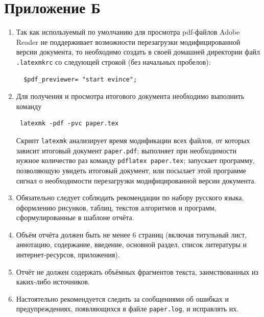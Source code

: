 \section{Приложение Б}

\begin{enumerate}

\item
Так как используемый по умолчанию для просмотра pdf-файлов Adobe Reader не 
поддерживает возможности перезагрузки модифицированной версии документа, то
необходимо создать в своей домашней директории файл \verb|.latexmkrc|
со следующей строкой (без начальных пробелов):

\begin{verbatim}
  $pdf_previewer= "start evince";
\end{verbatim} 

\item
Для получения и просмотра итогового документа необходимо выполнить команду

\begin{verbatim}
 latexmk -pdf -pvc paper.tex
\end{verbatim} 

\noindent
Скрипт \verb|latexmk| анализирует время модификации всех файлов, от которых
зависит итоговый документ \verb|paper.pdf|; выполняет при необходимости
нужное количество раз команду \verb|pdflatex paper.tex|; запускает программу,
позволяющую увидеть итоговый документ, или посылает этой программе
сигнал о необходимости перезагрузки модифицированной версии документа. 

\item
Обязательно следует соблюдать рекомендации по набору русского языка, 
оформлению рисунков, таблиц, текстов алгоритмов и программ, сформулированные
в шаблоне отчёта.

\item
Объём отчёта должен быть не менее
6 страниц (включая титульный лист, аннотацию, содержание, введение,
основной раздел, список литературы и интернет-ресурсов, приложения).

\item
Отчёт не должен содержать объёмных фрагментов текста, заимствованных из
каких-либо источников. 

\item
Настоятельно рекомендуется следить за сообщениями об ошибках и 
предупреждениях, появляющихся в файле \verb|paper.log|, и исправлять их.

\end{enumerate}
